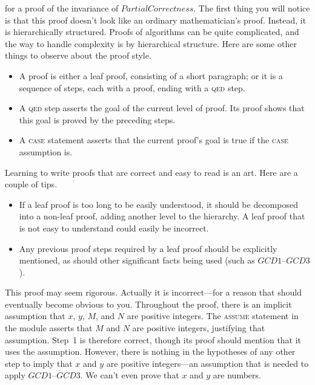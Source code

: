 for a proof of the invariance of
$PartialCorrectness$.  The first thing you will notice is that this
proof doesn't look like an ordinary mathematician's proof.  Instead,
it is hierarchically structured.  Proofs of algorithms can be quite
complicated, and the way to handle complexity is by hierarchical
structure.  Here are some other things to observe about the proof style.
\begin{itemize}
\item A proof is either a leaf proof, consisting of a short paragraph;
or it is a sequence of steps, each with a proof, ending with a
\textsc{qed} step.  

\item A \textsc{qed} step asserts the goal of the current level of
proof.  Its proof shows that this goal is proved by the preceding
steps.

\item A \textsc{case} statement asserts that the current proof's goal
is true if the \textsc{case} assumption is.
\end{itemize}
Learning to write proofs that are correct and easy to read is an art.
Here are a couple of tips.
\begin{itemize}
\item If a leaf proof is too long to be easily understood, it should
be decomposed into a non-leaf proof, adding another level to the
hierarchy.  A leaf proof that is not easy to understand could easily
be incorrect.

\item Any previous proof steps required by a leaf proof should
be explicitly mentioned, as should other significant facts being
used (such as $GCD1$--$GCD3$).
\end{itemize}
This proof may seem rigorous.  Actually it is incorrect---for a reason
that should eventually become obvious to you.  Throughout the proof,
there is an implicit assumption that $x$, $y$, $M$, and $N$ are
positive integers.  The \textsc{assume} statement in the module
asserts that $M$ and $N$ are positive integers, justifying that
assumption.  Step~1 is therefore correct, though its proof should
mention that it uses the assumption.  However, there is nothing in the
hypotheses of any other step to imply that $x$ and $y$ are positive
integers---an assumption that is needed to apply $GCD1$--$GCD3$.  We
can't even prove that $x$ and $y$ are numbers.

